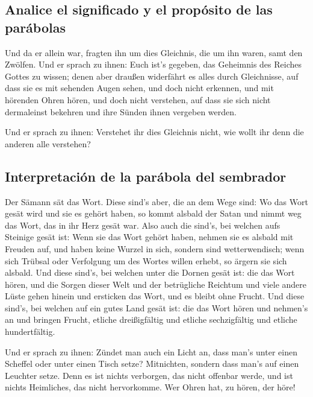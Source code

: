 \hypertarget{analice-el-significado-y-el-propuxf3sito-de-las-paruxe1bolas}{%
\subsection{Analice el significado y el propósito de las
parábolas}\label{analice-el-significado-y-el-propuxf3sito-de-las-paruxe1bolas}}

 Und da er allein war, fragten ihn um dies Gleichnis, die
um ihn waren, samt den Zwölfen.  Und er sprach zu ihnen:
Euch ist's gegeben, das Geheimnis des Reiches Gottes zu wissen; denen
aber draußen widerfährt es alles durch Gleichnisse,  auf
dass sie es mit sehenden Augen sehen, und doch nicht erkennen, und mit
hörenden Ohren hören, und doch nicht verstehen, auf dass sie sich nicht
dermaleinst bekehren und ihre Sünden ihnen vergeben werden.

 Und er sprach zu ihnen: Verstehet ihr dies Gleichnis
nicht, wie wollt ihr denn die anderen alle verstehen?

\hypertarget{interpretaciuxf3n-de-la-paruxe1bola-del-sembrador}{%
\subsection{Interpretación de la parábola del
sembrador}\label{interpretaciuxf3n-de-la-paruxe1bola-del-sembrador}}

 Der Sämann sät das Wort.  Diese sind's
aber, die an dem Wege sind: Wo das Wort gesät wird und sie es gehört
haben, so kommt alsbald der Satan und nimmt weg das Wort, das in ihr
Herz gesät war.  Also auch die sind's, bei welchen aufs
Steinige gesät ist: Wenn sie das Wort gehört haben, nehmen sie es
alsbald mit Freuden auf,  und haben keine Wurzel in sich,
sondern sind wetterwendisch; wenn sich Trübsal oder Verfolgung um des
Wortes willen erhebt, so ärgern sie sich alsbald.  Und
diese sind's, bei welchen unter die Dornen gesät ist: die das Wort
hören,  und die Sorgen dieser Welt und der betrügliche
Reichtum und viele andere Lüste gehen hinein und ersticken das Wort, und
es bleibt ohne Frucht.  Und diese sind's, bei welchen auf
ein gutes Land gesät ist: die das Wort hören und nehmen's an und bringen
Frucht, etliche dreißigfältig und etliche sechzigfältig und etliche
hundertfältig.

 Und er sprach zu ihnen: Zündet man auch ein Licht an,
dass man's unter einen Scheffel oder unter einen Tisch setze?
Mitnichten, sondern dass man's auf einen Leuchter setze. 
Denn es ist nichts verborgen, das nicht offenbar werde, und ist nichts
Heimliches, das nicht hervorkomme.  Wer Ohren hat, zu
hören, der höre!

